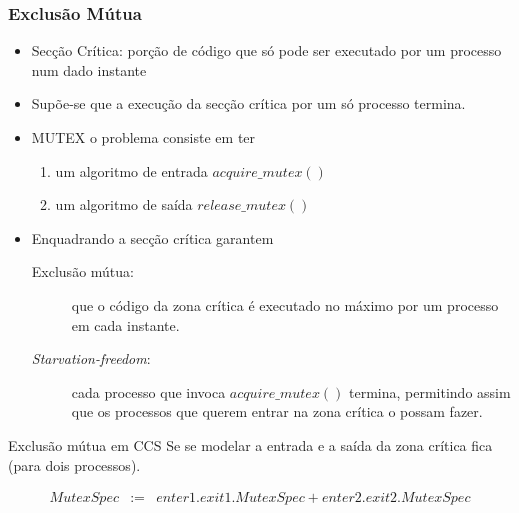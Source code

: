 \documentclass[aspectratio=169]{beamer}
\begin{document}
\begin{frame}
\frametitle{Exclusão Mútua}	
\begin{itemize}
	\item \alert{Secção Crítica}: porção de código que só pode ser executado por um processo num dado instante
\item Supõe-se que a execução da secção crítica por um só processo termina.
\item \alert{MUTEX}  o problema consiste em ter
\begin{enumerate}
	\item  um algoritmo de entrada $acquire\_mutex()$
\item um algoritmo de saída $release\_mutex()$
\end{enumerate}
\item Enquadrando a secção crítica garantem
\begin{description}
	\item[Exclusão mútua:] que o código da zona crítica é executado no máximo por um processo em cada instante.
\item[\emph{Starvation-freedom}:] cada processo que invoca $acquire\_mutex()$ termina, permitindo assim que os processos que querem entrar na zona crítica o possam fazer.
\end{description}
\end{itemize}
\end{frame}


\begin{frame}{Exclusão mútua em CCS}
Se se modelar a  entrada e a saída da zona crítica fica (para dois processos).

\begin{eqnarray*}
	MutexSpec &:=& enter1.exit1.MutexSpec + enter2.exit2.MutexSpec 
\end{eqnarray*}	
\end{frame}
\end{document}
